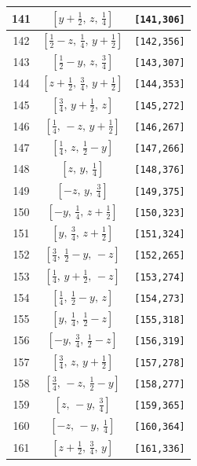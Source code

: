 \documentclass[fleqn,8pt]{jsarticle}
\begin{document}
\begin{longtable}{ccc}
141 & $\left[ y + \frac{1}{2},\, z,\, \frac{1}{4} \right]$ & {\tt [141,306]} \\ \hline
142 & $\left[ \frac{1}{2} - z,\, \frac{1}{4},\, y + \frac{1}{2} \right]$ & {\tt [142,356]} \\ \hline
143 & $\left[ \frac{1}{2} - y,\, z,\, \frac{3}{4} \right]$ & {\tt [143,307]} \\ \hline
144 & $\left[ z + \frac{1}{2},\, \frac{3}{4},\, y + \frac{1}{2} \right]$ & {\tt [144,353]} \\ \hline
145 & $\left[ \frac{3}{4},\, y + \frac{1}{2},\, z \right]$ & {\tt [145,272]} \\ \hline
146 & $\left[ \frac{1}{4},\, - z,\, y + \frac{1}{2} \right]$ & {\tt [146,267]} \\ \hline
147 & $\left[ \frac{1}{4},\, z,\, \frac{1}{2} - y \right]$ & {\tt [147,266]} \\ \hline
148 & $\left[ z,\, y,\, \frac{1}{4} \right]$ & {\tt [148,376]} \\ \hline
149 & $\left[ - z,\, y,\, \frac{3}{4} \right]$ & {\tt [149,375]} \\ \hline
150 & $\left[ - y,\, \frac{1}{4},\, z + \frac{1}{2} \right]$ & {\tt [150,323]} \\ \hline
151 & $\left[ y,\, \frac{3}{4},\, z + \frac{1}{2} \right]$ & {\tt [151,324]} \\ \hline
152 & $\left[ \frac{3}{4},\, \frac{1}{2} - y,\, - z \right]$ & {\tt [152,265]} \\ \hline
153 & $\left[ \frac{1}{4},\, y + \frac{1}{2},\, - z \right]$ & {\tt [153,274]} \\ \hline
154 & $\left[ \frac{1}{4},\, \frac{1}{2} - y,\, z \right]$ & {\tt [154,273]} \\ \hline
155 & $\left[ y,\, \frac{1}{4},\, \frac{1}{2} - z \right]$ & {\tt [155,318]} \\ \hline
156 & $\left[ - y,\, \frac{3}{4},\, \frac{1}{2} - z \right]$ & {\tt [156,319]} \\ \hline
157 & $\left[ \frac{3}{4},\, z,\, y + \frac{1}{2} \right]$ & {\tt [157,278]} \\ \hline
158 & $\left[ \frac{3}{4},\, - z,\, \frac{1}{2} - y \right]$ & {\tt [158,277]} \\ \hline
159 & $\left[ z,\, - y,\, \frac{3}{4} \right]$ & {\tt [159,365]} \\ \hline
160 & $\left[ - z,\, - y,\, \frac{1}{4} \right]$ & {\tt [160,364]} \\ \hline
161 & $\left[ z + \frac{1}{2},\, \frac{3}{4},\, y \right]$ & {\tt [161,336]} \\ \hline

\end{longtable}
\end{document}

